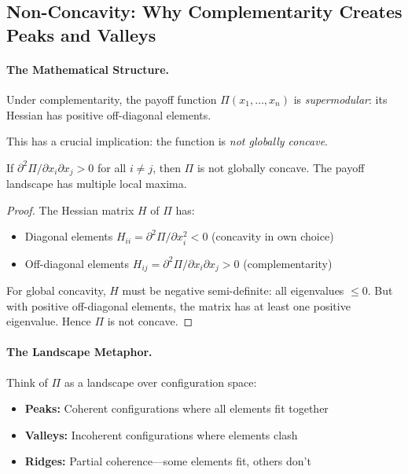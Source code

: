 \subsection{Non-Concavity: Why Complementarity Creates Peaks and Valleys}

\paragraph{The Mathematical Structure.}
Under complementarity, the payoff function $\Pi(x_1, \ldots, x_n)$ is 
\emph{supermodular}: its Hessian has positive off-diagonal elements.

This has a crucial implication: the function is \emph{not globally concave}.

\begin{proposition}
\label{prop:nonconcavity}
If $\partial^2 \Pi / \partial x_i \partial x_j > 0$ for all $i \neq j$,
then $\Pi$ is not globally concave.
The payoff landscape has multiple local maxima.
\end{proposition}

\begin{proof}
The Hessian matrix $H$ of $\Pi$ has:
\begin{itemize}
  \item Diagonal elements $H_{ii} = \partial^2 \Pi / \partial x_i^2 < 0$ (concavity in own choice)
  \item Off-diagonal elements $H_{ij} = \partial^2 \Pi / \partial x_i \partial x_j > 0$ (complementarity)
\end{itemize}

For global concavity, $H$ must be negative semi-definite: all eigenvalues $\leq 0$.
But with positive off-diagonal elements, the matrix has at least one positive eigenvalue.
Hence $\Pi$ is not concave.
\end{proof}

\paragraph{The Landscape Metaphor.}
Think of $\Pi$ as a landscape over configuration space:
\begin{itemize}
  \item \textbf{Peaks:} Coherent configurations where all elements fit together
  \item \textbf{Valleys:} Incoherent configurations where elements clash
  \item \textbf{Ridges:} Partial coherence---some elements fit, others don't
\end{itemize}

